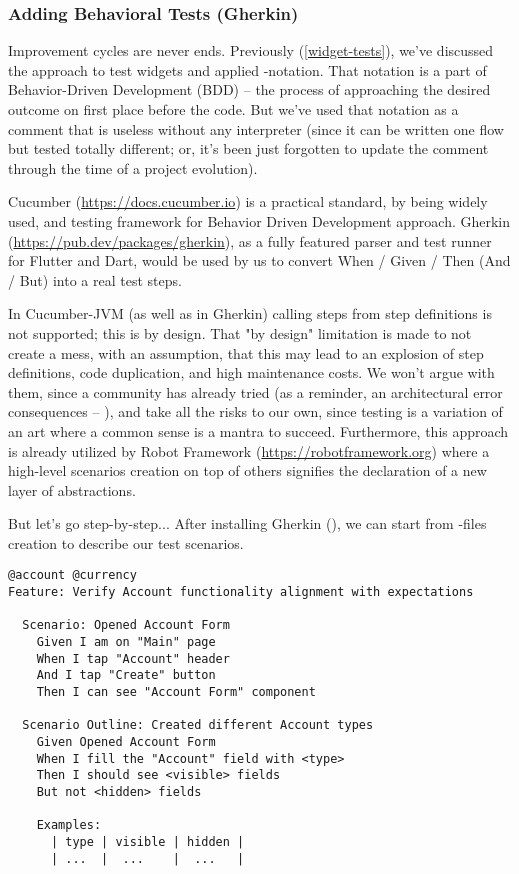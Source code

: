 \subsubsection{Adding Behavioral Tests (Gherkin)} \label{t-gherkin}

Improvement cycles are never ends. Previously (\ref{widget-tests}), we've discussed the approach to test widgets and 
applied -notation. That notation is a part of Behavior-Driven Development (BDD) -- the 
process of approaching the desired outcome on first place before the code. But we've used that notation as a comment 
that is useless without any interpreter (since it can be written one flow but tested totally different; or, it's been 
just forgotten to update the comment through the time of a project evolution).

Cucumber (\href{https://docs.cucumber.io}{https://docs.cucumber.io}) is a practical standard, by being widely used, 
and testing framework for Behavior Driven Development approach. Gherkin 
(\href{https://pub.dev/packages/gherkin}{https://pub.dev/packages/gherkin}), as a fully featured parser and 
test runner for Flutter and Dart, would be used by us to convert When / Given / Then (And / But) into a real test steps.

In Cucumber-JVM (as well as in Gherkin) calling steps from step definitions is not supported; this is by design. 
That "by design" limitation is made to not create a mess, with an assumption, that this may lead to an explosion of step 
definitions, code duplication, and high maintenance costs. We won't argue with them, since a community has already tried 
(as a reminder, an architectural error consequences -- \cite{Sanket19}), and take all the risks to our own, since testing 
is a variation of an art where a common sense is a mantra to succeed. Furthermore, this approach is already utilized by 
Robot Framework (\href{https://robotframework.org}{https://robotframework.org}) where a high-level scenarios creation 
on top of others signifies the declaration of a new layer of abstractions.

But let's go step-by-step... After installing Gherkin (), we can start from 
-files creation to describe our test scenarios.

\begin{lstlisting}[language=cucumber]
@account @currency
Feature: Verify Account functionality alignment with expectations

  Scenario: Opened Account Form
    Given I am on "Main" page
    When I tap "Account" header
    And I tap "Create" button
    Then I can see "Account Form" component

  Scenario Outline: Created different Account types
    Given Opened Account Form
    When I fill the "Account" field with <type>
    Then I should see <visible> fields
    But not <hidden> fields

    Examples: 
      | type | visible | hidden |
      | ...  |  ...    |  ...   |
\end{lstlisting}

